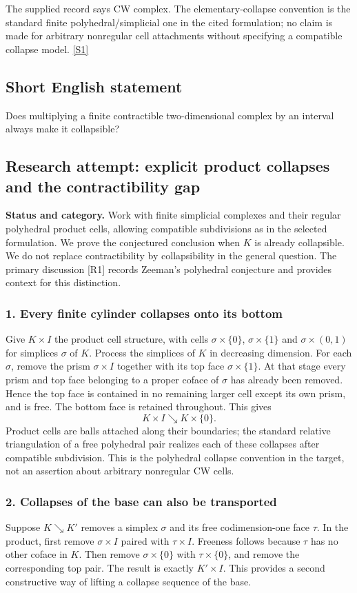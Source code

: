 \documentclass[11pt,a4paper]{article}
\newcommand{\sref}[2]{\hyperlink{source:#1:#2}{[S#2]}}
\begin{document}
The supplied record says CW complex. The elementary-collapse convention is the standard finite polyhedral/simplicial one in the cited formulation; no claim is made for arbitrary nonregular cell attachments without specifying a compatible collapse model. \sref{statement}{1}

\subsection{Short English statement}

Does multiplying a finite contractible two-dimensional complex by an interval always make it collapsible?

\subsection{Research attempt: explicit product collapses and the contractibility gap}
\textbf{Status and category.} Work with finite simplicial complexes and their regular polyhedral product cells, allowing compatible subdivisions as in the selected formulation. We prove the conjectured conclusion when $K$ is already collapsible. We do not replace contractibility by collapsibility in the general question. The primary discussion [R1] records Zeeman's polyhedral conjecture and provides context for this distinction.

\subsubsection{1. Every finite cylinder collapses onto its bottom}
Give $K\times I$ the product cell structure, with cells $\sigma\times\{0\}$, $\sigma\times\{1\}$ and $\sigma\times(0,1)$ for simplices $\sigma$ of $K$. Process the simplices of $K$ in decreasing dimension. For each $\sigma$, remove the prism $\sigma\times I$ together with its top face $\sigma\times\{1\}$. At that stage every prism and top face belonging to a proper coface of $\sigma$ has already been removed. Hence the top face is contained in no remaining larger cell except its own prism, and is free. The bottom face is retained throughout. This gives
\[K\times I\searrow K\times\{0\}.\tag{1}\]
Product cells are balls attached along their boundaries; the standard relative triangulation of a free polyhedral pair realizes each of these collapses after compatible subdivision. This is the polyhedral collapse convention in the target, not an assertion about arbitrary nonregular CW cells.

\subsubsection{2. Collapses of the base can also be transported}
Suppose $K\searrow K'$ removes a simplex $\sigma$ and its free codimension-one face $\tau$. In the product, first remove $\sigma\times I$ paired with $\tau\times I$. Freeness follows because $\tau$ has no other coface in $K$. Then remove $\sigma\times\{0\}$ with $\tau\times\{0\}$, and remove the corresponding top pair. The result is exactly $K'\times I$. This provides a second constructive way of lifting a collapse sequence of the base.
\end{document}

